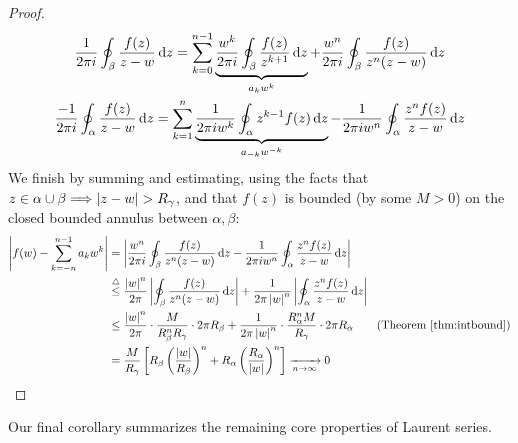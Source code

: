 \begin{proof}
	\begin{gather*}
		\frac 1{2\pi i}\oint_\beta\frac{f(z)}{z-w}\,{\mathrm{d} z}
		=\sum_{k=0}^{n-1}\underbrace{\frac{w^k}{2\pi i}\oint_\beta \frac{f(z)}{z^{k+1}}\,{\mathrm{d} z}}_{a_kw^k} +\frac{w^n}{2\pi i}\oint_\beta \frac{f(z)}{z^n(z-w)}\,{\mathrm{d} z}\\
		\frac{-1}{2\pi i}\oint_\alpha\frac{f(z)}{z-w}\,{\mathrm{d} z} =\sum_{k=1}^{n}\underbrace{\frac 1{2\pi iw^k}\oint_\alpha z^{k-1}f(z)\,{\mathrm{d} z}}_{a_{-k}w^{-k}} -\frac 1{2\pi i w^n}\oint_\alpha \frac{z^nf(z)}{z-w}\,{\mathrm{d} z}
	\end{gather*}
	We finish by summing and estimating, using the facts that $z\in\alpha\cup\beta\Longrightarrow\nm{z-w}>R_\gamma$, and that $f(z)$ is bounded (by some $M>0$) on the closed bounded annulus between $\alpha,\beta$:
	\begin{align*}
		\nm{f(w)-\sum_{k=-n}^{n-1}a_kw^k}
		&=\nm{\frac{w^n}{2\pi i}\oint_\beta \frac{f(z)}{z^n(z-w)}\,\dz -\frac 1{2\pi iw^n}\oint_\alpha \frac{z^nf(z)}{z-w}\,\dz}\\
		&\overset{\triangle}{\le} \frac{\nm w^n}{2\pi}\nm{\oint_\beta \frac{f(z)}{z^n(z-w)}\,\dz} +\frac 1{2\pi\nm w^n}\nm{\oint_\alpha \frac{z^nf(z)}{z-w}\,\dz}\\
		&\le \frac{\nm w^n}{2\pi}\cdot\frac{M}{R_\beta^nR_\gamma}\cdot 2\pi R_\beta +\frac 1{2\pi\nm w^n}\cdot \frac{R_\alpha^nM}{R_\gamma}\cdot 2\pi R_\alpha
			\tag{Theorem \ref{thm:intbound}}\\
		&=\frac M{R_\gamma}\left[R_\beta\left(\frac{\nm w}{R_\beta}\right)^n+R_\alpha\left(\frac{R_\alpha}{\nm w}\right)^n\right] \xrightarrow[n\to\infty]{} 0
		\tag*{\qedhere}
	\end{align*}
\end{proof}

\goodbreak



Our final corollary summarizes the remaining core properties of Laurent series.


